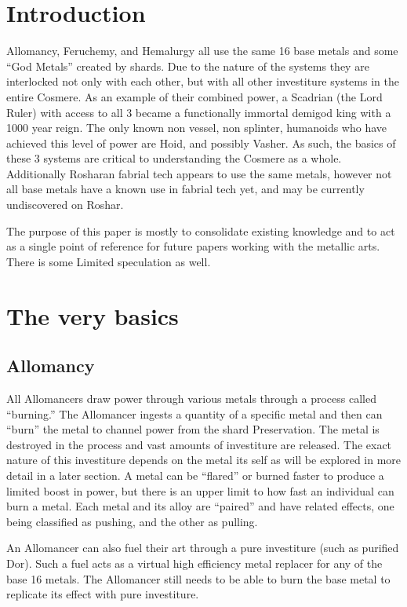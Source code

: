 \documentclass[conference]{IEEEtran}
\newcommand{\n}{\hfill\break}
\begin{document}
\section{\textbf{Introduction}}
Allomancy, Feruchemy, and Hemalurgy all use the same 16 base metals and some ``God Metals'' created by shards.\cite{ARS} Due to the nature of the systems they are interlocked not only with each other, but with all other investiture systems in the entire Cosmere.  As an example of their combined power, a Scadrian (the Lord Ruler) with access to all 3 became a functionally immortal demigod king with a 1000 year reign.\cite{TFE}  The only known non vessel, non splinter, humanoids who have achieved this level of power are Hoid, and possibly Vasher.  As such, the basics of these 3 systems are critical to understanding the Cosmere as a whole.  Additionally Rosharan fabrial tech appears to use the same metals,\cite{RoW-E7} however not all base metals have a known use in fabrial tech yet, and may be currently undiscovered on Roshar. 

The purpose of this paper is mostly to consolidate existing knowledge and to act as a single point of reference for future papers working with the metallic arts.  There is some Limited speculation as well.\n
\section{\textbf{The very basics}}
\subsection*{\textbf{Allomancy}}
All Allomancers draw power through various metals through a process called ``burning.''\cite{TFE-CH7}  The Allomancer ingests a quantity of a specific metal and then can ``burn'' the metal to channel power from the shard Preservation.\cite{allo-source}  The metal is destroyed in the process and vast amounts of investiture are released.  The exact nature of this investiture depends on the metal its self\cite{TFE-CH7} as will be explored in more detail in a later section.  A metal can be ``flared'' or burned faster to produce a limited boost in power, but there is an upper limit to how fast an individual can burn a metal.  Each metal and its alloy are ``paired'' and have related effects, one being classified as pushing, and the other as pulling.\cite{TFE-CH7}

An Allomancer can also fuel their art through a pure investiture (such as purified Dor). \cite{TLM-CH40}\cite{TLM-CH64}  Such a fuel acts as a virtual high efficiency metal replacer for any of the base 16 metals.  The Allomancer still needs to be able to burn the base metal to replicate its effect with pure investiture.
  
\end{document}
